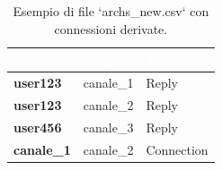 \documentclass[12pt]{article}
\begin{document}
	\begin{table}
		\begin{tabular}{|p{5cm}|p{4cm}|p{4cm}|}
			\hline
			\cellcolor{darkblue}\textcolor{white}{\textbf{Source}} & 
			\cellcolor{darkblue}\textcolor{white}{\textbf{Target}} & 
			\cellcolor{darkblue}\textcolor{white}{\textbf{Type}} \\
			\hline
			\textbf{user123} & canale\_1 & Reply \\
			\hline
			\textbf{user123} & canale\_2 & Reply\\
			\hline
			\textbf{user456} & canale\_3 & Reply\\
			\hline
			\textbf{canale\_1} & canale\_2 & Connection\\
		\end{tabular}
		\caption{Esempio di file `archs\_new.csv` con connessioni derivate.}
		\label{tab:archs_new}
	\end{table}
	\newpage
\end{document}
